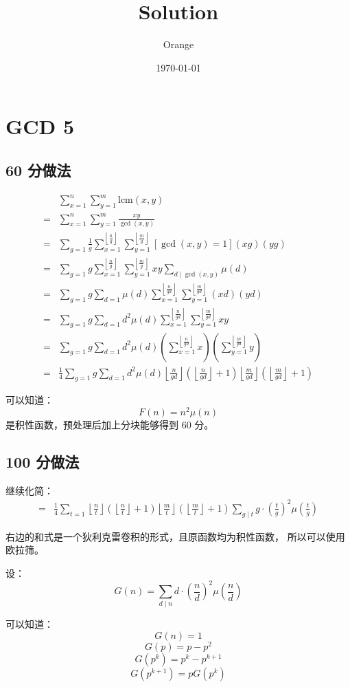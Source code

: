 \documentclass[12pt, UTF8]{article}
\title{Solution}
\author{Orange}
\date{\today}
\newcommand{\floorfrac}[2]{\left\lfloor \frac {#1} {#2} \right\rfloor}
\begin{document}
	\heiti

	\section{GCD 5}

	\subsection{60 分做法}

	\begin{align*}
		& \sum_{x = 1}^{n} \sum_{y = 1}^{m} \mathrm{lcm}(x, y)
		\\
		=& \sum_{x = 1}^{n} \sum_{y = 1}^{m} \frac {xy} {\gcd(x, y)}
		\\
		=& \sum_{g = 1}
		\frac {1} {g}
		\sum_{x = 1}^{\floorfrac {n} {g}}
		\sum_{y = 1}^{\floorfrac {m} {g}}
		[\gcd(x, y) = 1]
		(xg)(yg)
		\\
		=& \sum_{g = 1} g
		\sum_{x = 1}^{\floorfrac {n} {g}}
		\sum_{y = 1}^{\floorfrac {m} {g}}
		xy
		\sum_{d \mid \gcd(x, y)} \mu(d)
		\\
		=& \sum_{g = 1} g
		\sum_{d = 1} \mu(d)
		\sum_{x = 1}^{\floorfrac {n} {gd}}
		\sum_{y = 1}^{\floorfrac {m} {gd}}
		(xd)(yd)
		\\
		=& \sum_{g = 1} g
		\sum_{d = 1} d^2 \mu(d)
		\sum_{x = 1}^{\floorfrac {n} {gd}}
		\sum_{y = 1}^{\floorfrac {m} {gd}}
		xy
		\\
		=& \sum_{g = 1} g
		\sum_{d = 1} d^2 \mu(d)
		(\sum_{x = 1}^{\floorfrac {n} {gd}} x)
		(\sum_{y = 1}^{\floorfrac {m} {gd}} y)
		\\
		=& \frac {1} {4}
		\sum_{g = 1} g
		\sum_{d = 1} d^2 \mu(d)
		\floorfrac {n} {gd}
		(\floorfrac {n} {gd} + 1)
		\floorfrac {m} {gd}
		(\floorfrac {m} {gd} + 1)
	\end{align*}

	可以知道：
	$$
	F(n) = n^2 \mu(n)
	$$
	是积性函数，预处理后加上分块能够得到 60 分。

	\subsection{100 分做法}

	\bigskip
	继续化简：
	\begin{align*}
		=& \frac {1} {4}
		\sum_{t = 1}
		\floorfrac {n} {t}
		(\floorfrac {n} {t} + 1)
		\floorfrac {m} {t}
		(\floorfrac {m} {t} + 1)
		\sum_{g \mid t}
		g \cdot (\frac {t} {g})^2 \mu(\frac {t} {g})
	\end{align*}
	
	右边的和式是一个狄利克雷卷积的形式，且原函数均为积性函数，
	所以可以使用欧拉筛。

	设：
	$$
	G(n) = \sum_{d \mid n} d \cdot (\frac {n} {d})^2 \mu(\frac {n} {d}) 
	$$

	可以知道：
	$$
	G(n) = 1
	$$
	$$
	G(p) = p - p^2
	$$
	$$
	G(p^k) = p^k - p^{k + 1}
	$$
	$$
	G(p^{k + 1}) = pG(p^k)
	$$
\end{document}
